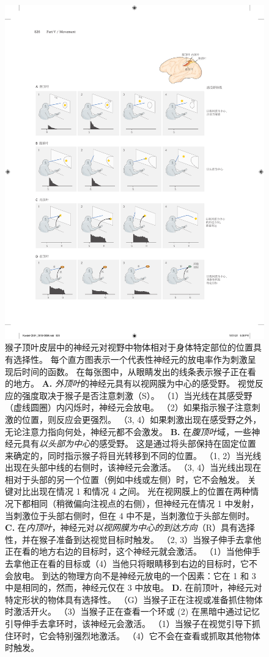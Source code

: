 \begin{figure}[htbp]
	\centering
	\includegraphics[width=0.89\linewidth]{chap34/fig_34_5}
	\caption{猴子顶叶皮层中的神经元对视野中物体相对于身体特定部位的位置具有选择性。
		每个直方图表示一个代表性神经元的放电率作为刺激呈现后时间的函数。
		在每张图中，从眼睛发出的线条表示猴子正在看的地方。
		\textbf{A.} \textit{外顶叶}的神经元具有以视网膜为中心的感受野。
		视觉反应的强度取决于猴子是否注意刺激（S）。
		（1）当光线在其感受野（虚线圆圈）内闪烁时，神经元会放电。
		（2）如果指示猴子注意刺激的位置，则反应会更强烈。 
		（3, 4）如果刺激出现在感受野之外，无论注意力指向何处，神经元都不会激发。
		\textbf{B.} 在\textit{腹顶叶}域，一些神经元具有\textit{以头部为中心}的感受野。
		这是通过将头部保持在固定位置来确定的，同时指示猴子将目光转移到不同的位置。
		（1, 2）当光线出现在头部中线的右侧时，该神经元会激活。
		（3, 4）当光线出现在相对于头部的另一个位置（例如中线或左侧）时，它不会触发。
		 关键对比出现在情况 1 和情况 4 之间。
		 光在视网膜上的位置在两种情况下都相同（稍微偏向注视点的右侧），但神经元在情况 1 中发射，当刺激位于头部右侧时，但在 4 中不是，当刺激位于头部左侧时。 
		 \textbf{C.} 在\textit{内顶叶}，神经元对\textit{以视网膜为中心的到达方向}（R）具有选择性，并在猴子准备到达视觉目标时触发。
		 （2, 3）当猴子伸手去拿他正在看的地方右边的目标时，这个神经元就会激活。
		 （1）当他伸手去拿他正在看的目标或（4）当他只将眼睛移到右边的目标时，它不会放电。
		 到达的物理方向不是神经元放电的一个因素：它在 1 和 3 中是相同的，然而，神经元仅在 3 中放电。
		 \textbf{D.} 在前顶叶，神经元对特定形状的物体具有选择性。
		 （G）当猴子正在注视或准备抓住物体时激活开火。
		 （3）当猴子正在查看一个环或 (2) 在黑暗中通过记忆引导伸手去拿环时，该神经元会激活。
		 （1）当猴子在视觉引导下抓住环时，它会特别强烈地激活。
		 （4）它不会在查看或抓取其他物体时触发。}
	\label{fig:34_5}
\end{figure}


